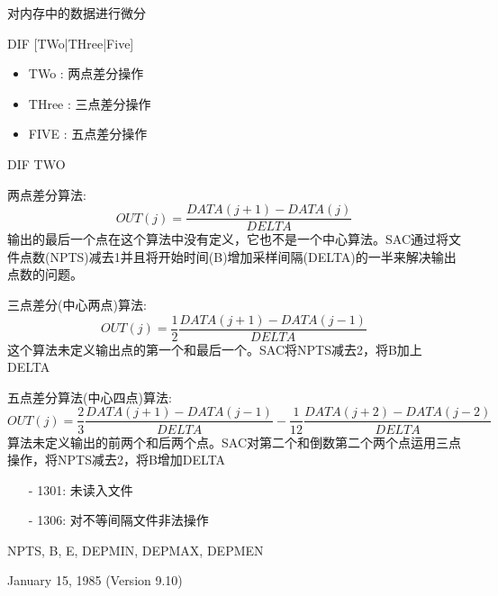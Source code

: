 \label{cmd:dif}

对内存中的数据进行微分

DIF [TWo|THree|Five]

\begin{itemize}
\item TWo : 两点差分操作
\item THree : 三点差分操作
\item FIVE : 五点差分操作
\end{itemize}

DIF TWO

两点差分算法:
\[ OUT(j) =\frac{DATA(j+1) -DATA(j)}{DELTA} \]
输出的最后一个点在这个算法中没有定义，它也不是一个中心算法。SAC通过将文件点数(NPTS)减去1并且将开始时间(B)增加采样间隔(DELTA)的一半来解决输出点数的问题。 

三点差分(中心两点)算法:
\[ OUT(j) = \frac{1}{2} \frac{DATA(j+1) -DATA(j-1)}{DELTA} \]
这个算法未定义输出点的第一个和最后一个。SAC将NPTS减去2，将B加上DELTA

五点差分算法(中心四点)算法:
\[ OUT(j) = \frac{2}{3} \frac{DATA(j+1) -DATA(j-1)}{DELTA} - \frac{1}{12} \frac{DATA(j+2) -DATA(j-2)}{DELTA} \]
算法未定义输出的前两个和后两个点。SAC对第二个和倒数第二个两个点运用三点操作，将NPTS减去2，将B增加DELTA

\begin{itemize}
\item[-]1301: 未读入文件
\item[-]1306: 对不等间隔文件非法操作
\end{itemize}

NPTS, B, E, DEPMIN, DEPMAX, DEPMEN

January 15, 1985 (Version 9.10)
